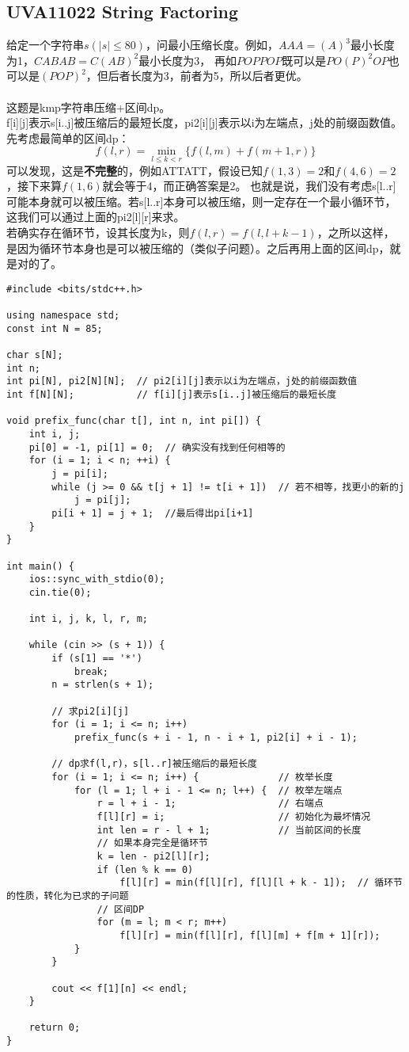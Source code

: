     \subsection{UVA11022 String Factoring}
        给定一个字符串$s(|s| \le 80)$，问最小压缩长度。例如，$AAA=(A)^3$最小长度为1，$CABAB=C(AB)^2$最小长度为3，
        再如$POPPOP$既可以是$PO(P)^2OP$也可以是$(POP)^2$，但后者长度为3，前者为5，所以后者更优。\\\\
        这题是kmp字符串压缩+区间dp。\\
        f[i][j]表示s[i..j]被压缩后的最短长度，pi2[i][j]表示以i为左端点，j处的前缀函数值。先考虑最简单的区间dp：
        $$f(l,r)=\min_{l \le k < r}{\{f(l,m)+f(m+1,r)\}}$$
        可以发现，这是\textbf{不完整}的，例如ATTATT，假设已知$f(1,3)=2$和$f(4,6)=2$，接下来算$f(1,6)$就会等于4，而正确答案是2。
        也就是说，我们没有考虑s[l..r]可能本身就可以被压缩。若s[l..r]本身可以被压缩，则一定存在一个最小循环节，这我们可以通过上面的pi2[l][r]来求。\\
        若确实存在循环节，设其长度为k，则$f(l,r)=f(l,l+k-1)$，之所以这样，是因为循环节本身也是可以被压缩的（类似子问题）。之后再用上面的区间dp，就是对的了。
        \begin{lstlisting}
#include <bits/stdc++.h>

using namespace std;
const int N = 85;

char s[N];
int n;
int pi[N], pi2[N][N];  // pi2[i][j]表示以i为左端点，j处的前缀函数值
int f[N][N];           // f[i][j]表示s[i..j]被压缩后的最短长度

void prefix_func(char t[], int n, int pi[]) {
    int i, j;
    pi[0] = -1, pi[1] = 0;  // 确实没有找到任何相等的
    for (i = 1; i < n; ++i) {
        j = pi[i];
        while (j >= 0 && t[j + 1] != t[i + 1])  // 若不相等，找更小的新的j
            j = pi[j];
        pi[i + 1] = j + 1;  //最后得出pi[i+1]
    }
}

int main() {
    ios::sync_with_stdio(0);
    cin.tie(0);

    int i, j, k, l, r, m;

    while (cin >> (s + 1)) {
        if (s[1] == '*')
            break;
        n = strlen(s + 1);

        // 求pi2[i][j]
        for (i = 1; i <= n; i++)
            prefix_func(s + i - 1, n - i + 1, pi2[i] + i - 1);

        // dp求f(l,r)，s[l..r]被压缩后的最短长度
        for (i = 1; i <= n; i++) {              // 枚举长度
            for (l = 1; l + i - 1 <= n; l++) {  // 枚举左端点
                r = l + i - 1;                  // 右端点
                f[l][r] = i;                    // 初始化为最坏情况
                int len = r - l + 1;            // 当前区间的长度
                // 如果本身完全是循环节
                k = len - pi2[l][r];
                if (len % k == 0)
                    f[l][r] = min(f[l][r], f[l][l + k - 1]);  // 循环节的性质，转化为已求的子问题
                // 区间DP
                for (m = l; m < r; m++)
                    f[l][r] = min(f[l][r], f[l][m] + f[m + 1][r]);
            }
        }

        cout << f[1][n] << endl;
    }

    return 0;
}
        \end{lstlisting}
